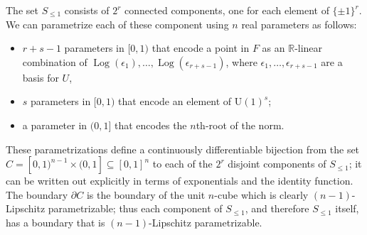 \documentclass[UTF8,11pt]{ctexart}
\theoremstyle{definition}
\newcommand{\R}{\mathbb R}
\begin{document}
The set $S_{\leq1}$ consists of $2^r$ connected components, one for each element of $\{\pm1\}^r$. We can parametrize each of these component using $n$ real parameters as follows:
\begin{itemize}
\item $r+s-1$ parameters in $[0,1)$ that encode a point in $F$ as an $\R$-linear combination of $\operatorname{Log}(\epsilon_1),\ldots,\operatorname{Log}(\epsilon_{r+s-1})$, where $\epsilon_1,\ldots,\epsilon_{r+s-1}$ are a basis for $U$,
\item $s$ parameters in $[0,1)$ that encode an element of $\mathrm U(1)^s$;
\item a parameter in $(0,1]$ that encodes the $n$th-root of the norm.
\end{itemize}
These parametrizations define a continuously differentiable bijection from the set $C=[0,1)^{n-1}\times(0,1]\subseteq[0,1]^n$ to each of the $2^r$ disjoint components of $S_{\leq1}$; it can be written out explicitly in terms of exponentials and the identity function. The boundary $\partial C$ is the boundary of the unit $n$-cube which is clearly $(n-1)$-Lipschitz parametrizable; thus each component of $S_{\leq1}$, and therefore $S_{\leq1}$ itself, has a boundary that is $(n-1)$-Lipschitz parametrizable.
\end{document}
